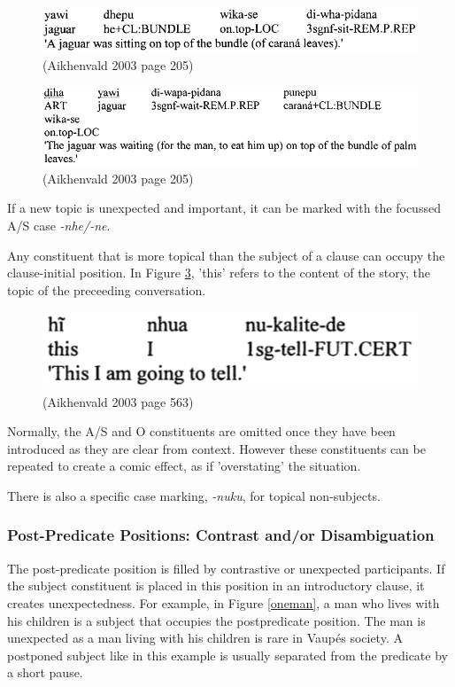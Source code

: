 \documentclass{article}
\begin{document}
\begin{figure}[h!]
  \centering
  \includegraphics[scale = 0.44]{jaguar1.png}
    \caption{(Aikhenvald 2003 page 205)}
    \label{jaguar1}
\end{figure}

\begin{figure}[h!]
  \centering
  \includegraphics[scale = 0.44]{jaguar2.png}
    \caption{(Aikhenvald 2003 page 205)}
    \label{jaguar2}
\end{figure}

\noindent If a new topic is unexpected and important, it can be marked with the focussed A/S case \textit{-nhe/-ne}. %

\noindent Any constituent that is more topical than the subject of a clause can occupy the clause-initial position. In Figure \ref*{thistell}, 'this' refers to the content of the story, the topic of the preceeding conversation.

\begin{figure}[h!]
  \centering
  \includegraphics[scale = 0.38]{thistell.png}
    \caption{(Aikhenvald 2003 page 563)}
    \label{thistell}
\end{figure}

\noindent Normally, the A/S and O constituents are omitted once they have been introduced as they are clear from context. However these constituents can be repeated to create a comic effect, as if 'overstating' the situation.

\noindent There is also a specific case marking, \textit{-nuku}, for topical non-subjects.
\subsubsection{Post-Predicate Positions: Contrast and/or Disambiguation}
The post-predicate position is filled by contrastive or unexpected participants. If the subject constituent is placed in this position in an introductory clause, it creates unexpectedness. For example, in Figure \ref*{oneman}, a man who lives with his children is a subject that occupies the postpredicate position. The man is unexpected as a man living with his children is rare in Vaupés society. A postponed subject like in this example is usually separated from the predicate by a short pause.
\end{document}
